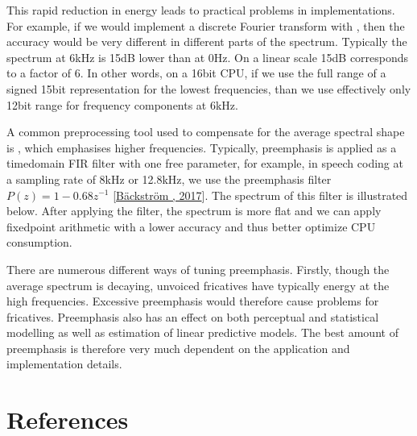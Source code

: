\documentclass[letterpaper,10pt,english]{jupyterBook}
\begin{document}
\sphinxAtStartPar
This rapid reduction in energy leads to practical problems in
implementations. For example, if we would implement a discrete Fourier
transform with , then
the accuracy would be very different in different parts of the spectrum.
Typically the spectrum at 6kHz is 15dB lower than at 0Hz. On a linear
scale 15dB corresponds to a factor of 6. In other words, on a 16\sphinxhyphen{}bit
CPU, if we use the full range of a signed 15\sphinxhyphen{}bit representation for the
lowest frequencies, than we use effectively only 12\sphinxhyphen{}bit range for
frequency components at 6kHz.

\sphinxAtStartPar
A common pre\sphinxhyphen{}processing tool used to compensate for the average spectral
shape is , which emphasises higher frequencies. Typically,
pre\sphinxhyphen{}emphasis is applied as a time\sphinxhyphen{}domain FIR filter with one free
parameter, for example, in speech coding at a sampling rate of 8kHz or
12.8kHz, we use the pre\sphinxhyphen{}emphasis filter \( P(z)=1-0.68 z^{-1} \) {[}\hyperlink{cite.Transmission/Modified_discrete_cosine_transform_MDCT:id43}{Bäckström , 2017}{]}. The
spectrum of this filter is illustrated below. After applying the
filter, the spectrum is more flat and we can apply fixed\sphinxhyphen{}point
arithmetic with a lower accuracy and thus better optimize CPU
consumption.

\sphinxAtStartPar
There are numerous different ways of tuning pre\sphinxhyphen{}emphasis. Firstly,
though the average spectrum is decaying, unvoiced fricatives have
typically  energy at the high frequencies. Excessive pre\sphinxhyphen{}emphasis
would therefore cause problems for fricatives. Pre\sphinxhyphen{}emphasis also has an
effect on both perceptual and statistical modelling as well as
estimation of linear predictive models. The best amount of pre\sphinxhyphen{}emphasis
is therefore very much dependent on the application and implementation
details.

\sphinxAtStartPar
{}


\section{References}
\label{\detokenize{Preprocessing/Pre-emphasis:references}}
\sphinxstepscope
\end{document}
